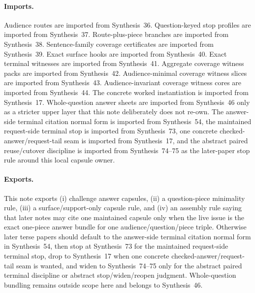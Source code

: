 \documentclass[11pt]{article}
\begin{document}
\paragraph{Imports.}
Audience routes are imported from Synthesis~36.\cite{series:challengeroutes}
Question-keyed stop profiles are imported from Synthesis~37.\cite{series:challengestops}
Route-plus-piece branches are imported from Synthesis~38.\cite{series:challengebranches}
Sentence-family coverage certificates are imported from Synthesis~39.\cite{series:challengecoverage}
Exact surface hooks are imported from Synthesis~40.\cite{series:challengesurfacehooks}
Exact terminal witnesses are imported from Synthesis~41.\cite{series:challengeterminalwitnesses}
Aggregate coverage witness packs are imported from Synthesis~42.\cite{series:challengecoveragewitnesspacks}
Audience-minimal coverage witness slices are imported from Synthesis~43.\cite{series:challengecoveragewitnessslices}
Audience-invariant coverage witness cores are imported from Synthesis~44.\cite{series:challengecoveragewitnesscores}
The concrete worked instantiation is imported from Synthesis~17.\cite{series:workedexample}
Whole-question answer sheets are imported from Synthesis~46 only as a stricter upper layer that this note deliberately does not re-own.\cite{series:challengeanswersheets}
The answer-side terminal citation normal form is imported from Synthesis~54, the maintained request-side terminal stop is imported from Synthesis~73, one concrete checked-answer/request-tail seam is imported from Synthesis~17, and the abstract paired reuse/cutover discipline is imported from Synthesis~74--75 as the later-paper stop rule around this local capsule owner.\cite{series:challengeanswerreviewmenus,series:publicrequestresponsepacketrefreshresponsepacketclosureverdicts,series:workedexample,series:publicrequestresponsepacketrefreshresponsepacketclosureverdicts,series:pairedterminalcitationdiscipline,series:pairedterminalcutoverrules}

\paragraph{Exports.}
This note exports (i) challenge answer capsules, (ii) a question-piece minimality rule, (iii) a surface/support-only capsule rule, and (iv) an assembly rule saying that later notes may cite one maintained capsule only when the live issue is the exact one-piece answer bundle for one audience/question/piece triple.
Otherwise later terse papers should default to the answer-side terminal citation normal form in Synthesis~54, then stop at Synthesis~73 for the maintained request-side terminal stop, drop to Synthesis~17 when one concrete checked-answer/request-tail seam is wanted, and widen to Synthesis~74--75 only for the abstract paired terminal discipline or abstract stop/widen/reopen judgment. Whole-question bundling remains outside scope here and belongs to Synthesis~46.\cite{series:challengeanswersheets,series:challengeanswerreviewmenus,series:publicrequestresponsepacketrefreshresponsepacketclosureverdicts,series:workedexample,series:publicrequestresponsepacketrefreshresponsepacketclosureverdicts,series:pairedterminalcitationdiscipline,series:pairedterminalcutoverrules}
\end{document}
